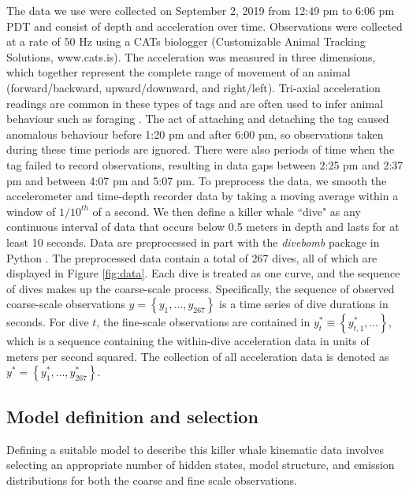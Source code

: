 The data we use were collected on September 2, 2019 from 12:49 pm to 6:06 pm PDT and consist of depth and acceleration over time. Observations were collected at a rate of 50 Hz using a CATs biologger (Customizable Animal Tracking Solutions, www.cats.is). The acceleration was measured in three dimensions, which together represent the complete range of movement of an animal (forward/backward, upward/downward, and right/left). Tri-axial acceleration readings are common in these types of tags and are often used to infer animal behaviour such as foraging \citep{Cade:2017,Fehlmann:2017,Wright:2017}. The act of attaching and detaching the tag caused anomalous behaviour before 1:20 pm and after 6:00 pm, so observations taken during these time periods are ignored. There were also periods of time when the tag failed to record observations, resulting in data gaps between 2:25 pm and 2:37 pm and between 4:07 pm and 5:07 pm. To preprocess the data, we smooth the accelerometer and time-depth recorder data by taking a moving average within a window of $1/10^{th}$ of a second. We then define a killer whale ``dive" as any continuous interval of data that occurs below 0.5 meters in depth and lasts for at least 10 seconds. Data are preprocessed in part with the \textit{divebomb} package in Python \citep{Nunes:2018}. The preprocessed data contain a total of 267 dives, all of which are displayed in Figure \ref{fig:data}. Each dive is treated as one curve, and the sequence of dives makes up the coarse-scale process. Specifically, the sequence of observed coarse-scale observations $y = \left\{y_1,\ldots,y_{267}\right\}$ is a time series of dive durations in seconds. For dive $t$, the fine-scale observations are contained in $y^*_{t} \equiv \left\{y^*_{t,1},\ldots \right\}$, which is a sequence containing the within-dive acceleration data in units of meters per second squared. The collection of all acceleration data is denoted as $y^* = \left\{y^*_1,\ldots,y^*_{267}\right\}$.

\subsection{Model definition and selection}
\label{subsec:model_selection}

Defining a suitable model to describe this killer whale kinematic data involves selecting an appropriate number of hidden states, model structure, and emission distributions for both the coarse and fine scale observations.

